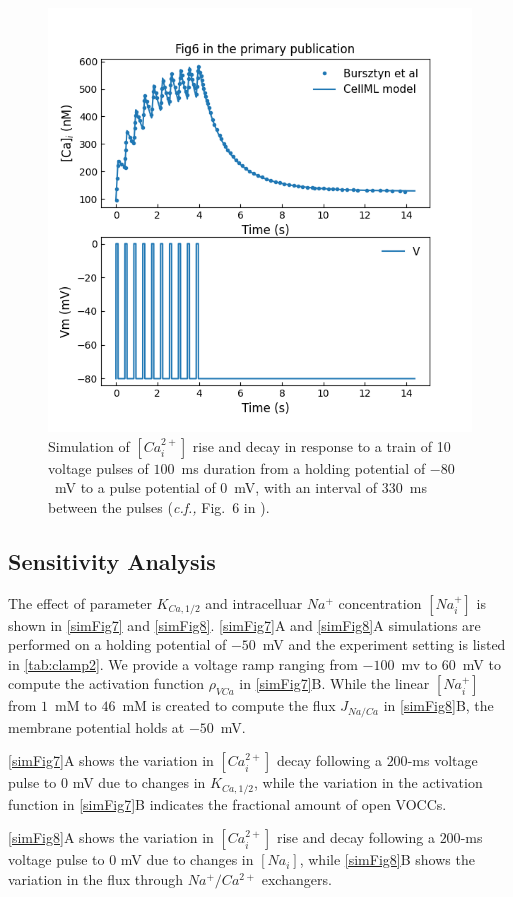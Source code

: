 \documentclass[fleqn,10pt]{physiome}
\begin{document}
\begin{figure}[ht]\centering
\includegraphics[width=0.7\linewidth]{./figs/simFig6.png}
\caption{Simulation of $[Ca_{i}^{2+}]$ rise and decay in response to a train of 10 voltage pulses of $100$~ms duration from a holding potential of $-80$~mV to a pulse potential of $0$~mV, with an interval of $330$~ms between the pulses (\emph{c.f.,} Fig.~6 in \citet{bursztyn2007mathematical}).}
\label{simFig6}
\end{figure}

\subsection{Sensitivity Analysis}

The effect of parameter $K_{Ca,1/2}$ and intracelluar $Na^{+}$ concentration $[Na_i^+]$ is shown in \autoref{simFig7} and \autoref{simFig8}.  \autoref{simFig7}A and \autoref{simFig8}A simulations are performed on a holding potential of $-50$~mV and the experiment setting is listed in \autoref{tab:clamp2}. We provide a voltage ramp ranging from $-100$~mv to $60$~mV to compute the activation function $\rho_{VCa}$ in \autoref{simFig7}B. While the linear $[Na_i^{+}]$ from $1$~mM to $46$~mM is created to compute the flux $J_{Na/Ca}$ in \autoref{simFig8}B, the membrane potential holds at $-50$~mV. 

\autoref{simFig7}A shows the variation in $[Ca_{i}^{2+}]$ decay following a $200$-ms voltage pulse to $0$ mV due to changes in $K_{Ca,1/2}$, while the variation in the activation function in \autoref{simFig7}B indicates the fractional amount of open VOCCs. 

\autoref{simFig8}A shows the variation in $[Ca_{i}^{2+}]$ rise and decay following a $200$-ms voltage pulse to $0$ mV due to changes in $[Na_i]$, while \autoref{simFig8}B shows the variation in the flux through $Na^{+}/Ca^{2+}$ exchangers.
\end{document}
